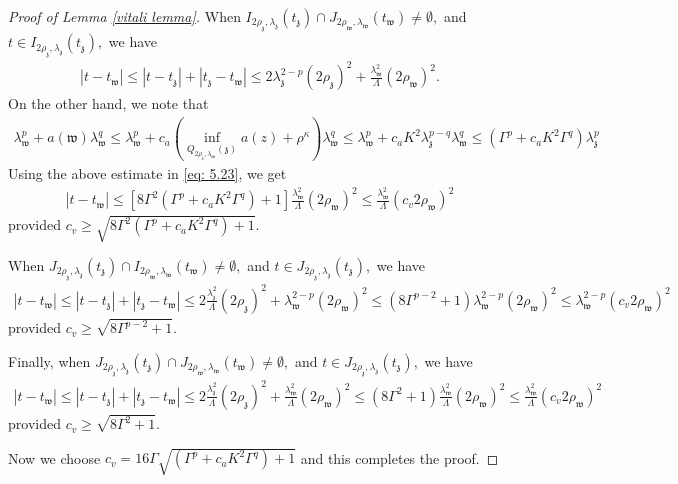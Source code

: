 \documentclass[notitlepage,11pt,reqno]{amsart}
\theoremstyle{definition}
\numberwithin{equation}{section}
\newcommand{\la}{\lambda}
\newcommand{\La}{\Lambda}
\newcommand{\fw}{{\mathfrak{w}}}
\newcommand{\fz}{{\mathfrak{z}}}
\begin{document}
\begin{proof}[Proof of Lemma \ref{vitali lemma}]
When $I_{2\rho_{\mathfrak z}, \lambda_{\mathfrak z}}(t_{\mathfrak z})\cap J_{2 \rho_{\mathfrak w}, \lambda_{\mathfrak w}}(t_{\mathfrak w})\neq \emptyset,$ and $t \in I_{2\rho_{\mathfrak z}, \lambda_{\mathfrak z}}(t_{\mathfrak z}),$ we have
\begin{align} \label{eq: 5.23}
|t-t_{\mathfrak{w}}|\leq |t-t_{\mathfrak{z}}|+|t_{\mathfrak{z}}-t_{\mathfrak{w}}|\leq 2 \lambda^{2-p}_{\mathfrak z}(2\rho_{\mathfrak z})^2+\frac{\la^2_{\mathfrak w}}{\La}(2\rho_{\mathfrak w})^2.
\end{align}
On the other hand, we note that
\begin{align*}
    \lambda^p_{\fw}+a(\fw)\lambda^q_{\fw} \leq \lambda^p_{\fw}+c_a\left(\inf_{Q_{2\rho_{\fz}, \lambda_{\fw}}(\fz)}a(z)+\rho^{\kappa}\right)\lambda^q_{\fw}\leq \lambda^p_{\fw}+ c_a K^2 \lambda^{p-q}_{\fz}\lambda^q_{\fw}\leq \left(\Gamma^p+c_aK^2 \Gamma^q\right)\lambda^p_{\fz}
\end{align*}
Using the above estimate in \eqref{eq: 5.23}, we get
\begin{align*}
|t-t_{\mathfrak{w}}| \leq \left[8\Gamma^2(\Gamma^p+c_aK^2 \Gamma^q)+1\right]\frac{\lambda^2_{\fw}}{\La}(2\rho_{\fw})^2 \leq \frac{\lambda^2_{\fw}}{\La}(c_v 2\rho_{\fw})^2    
\end{align*}
provided $c_v\geq \sqrt{8\Gamma^2(\Gamma^p+c_aK^2 \Gamma^q)+1}.$

When $J_{2\rho_{\mathfrak z}, \lambda_{\mathfrak z}}(t_{\mathfrak z})\cap I_{2 \rho_{\mathfrak w}, \lambda_{\mathfrak w}}(t_{\mathfrak w})\neq \emptyset,$ and $t \in J_{2\rho_{\mathfrak z}, \lambda_{\mathfrak z}}(t_{\mathfrak z}),$ we have
\begin{align*}
|t-t_{\mathfrak{w}}|\leq |t-t_{\mathfrak{z}}|+|t_{\mathfrak{z}}-t_{\mathfrak{w}}|\leq 2 \frac{\lambda^2_{\fz}}{\La}(2\rho_{\mathfrak z})^2+\la^{2-p}_{\mathfrak w}(2\rho_{\mathfrak w})^2 \leq (8\Gamma^{p-2}+1)\lambda^{2-p}_{\fw}(2\rho_{\fw})^2\leq \lambda^{2-p}_{\fw}(c_v 2\rho_{\fw})^2
\end{align*}
provided $c_v \geq \sqrt{8\Gamma^{p-2}+1}.$

Finally, when $J_{2\rho_{\mathfrak z}, \lambda_{\mathfrak z}}(t_{\mathfrak z})\cap J_{2 \rho_{\mathfrak w}, \lambda_{\mathfrak w}}(t_{\mathfrak w})\neq \emptyset,$ and $t \in J_{2\rho_{\mathfrak z}, \lambda_{\mathfrak z}}(t_{\mathfrak z}),$ we have
\begin{align*}
|t-t_{\mathfrak{w}}|\leq |t-t_{\mathfrak{z}}|+|t_{\mathfrak{z}}-t_{\mathfrak{w}}|\leq 2 \frac{\lambda^2_{\fz}}{\La}(2\rho_{\mathfrak z})^2+\frac{\la^{2}_{\mathfrak w}}{\La}(2\rho_{\mathfrak w})^2 \leq (8\Gamma^2+1)\frac{\lambda^2_{\fw}}{\La}(2\rho_{\fw})^2\leq \frac{\lambda^2_{\fw}}{\La}(c_v2\rho_{\fw})^2
\end{align*}
provided $c_v \geq \sqrt{8\Gamma^2+1}.$

Now we choose $c_v = 16\Gamma \sqrt{(\Gamma^p+c_aK^2 \Gamma^q)+1}$ and this completes the proof.
\end{proof}
\end{document}
